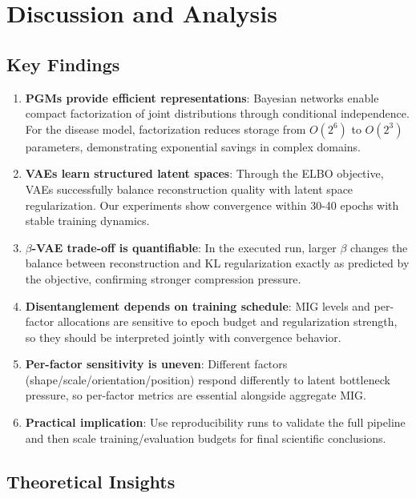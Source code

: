 \documentclass[conference]{IEEEtran}
\begin{document}
\section{Discussion and Analysis}

\subsection{Key Findings}

\begin{enumerate}
    \item \textbf{PGMs provide efficient representations}: Bayesian networks enable compact factorization of joint distributions through conditional independence. For the disease model, factorization reduces storage from $O(2^6)$ to $O(2^3)$ parameters, demonstrating exponential savings in complex domains.
    
    \item \textbf{VAEs learn structured latent spaces}: Through the ELBO objective, VAEs successfully balance reconstruction quality with latent space regularization. Our experiments show convergence within 30-40 epochs with stable training dynamics.
    
    \item \textbf{$\beta$-VAE trade-off is quantifiable}: In the executed run, larger $\beta$ changes the balance between reconstruction and KL regularization exactly as predicted by the objective, confirming stronger compression pressure.
    
    \item \textbf{Disentanglement depends on training schedule}: MIG levels and per-factor allocations are sensitive to epoch budget and regularization strength, so they should be interpreted jointly with convergence behavior.
    
    \item \textbf{Per-factor sensitivity is uneven}: Different factors (shape/scale/orientation/position) respond differently to latent bottleneck pressure, so per-factor metrics are essential alongside aggregate MIG.
    
    \item \textbf{Practical implication}: Use reproducibility runs to validate the full pipeline and then scale training/evaluation budgets for final scientific conclusions.
\end{enumerate}

\subsection{Theoretical Insights}
\end{document}
